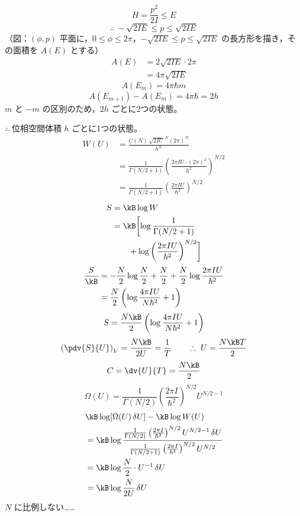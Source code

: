 \[ H=\frac{p^{2}}{2I}\le E \]
\[ \therefore\ -\sqrt{2IE}\le p\le\sqrt{2IE} \]
（図：$(\phi,p)$ 平面に，$0\le\phi\le2\pi$，$-\sqrt{2IE}\le p\le\sqrt{2IE}$ の長方形を描き，その面積を $A(E)$ とする）
\begin{align*}
A(E)&=2\sqrt{2IE}\cdot2\pi\\
&=4\pi\sqrt{2IE}
\end{align*}
\[ A(E_{m})=4\pi\hbar m \]
\[ A(E_{m+1})-A(E_{m})=4\pi\hbar=2h \]
$m$ と $-m$ の区別のため，$2h$ ごとに2つの状態。

$\therefore$ 位相空間体積 $h$ ごとに1つの状態。
\begin{align*}
W(U)&=\frac{C(N)\,\sqrt{2IU}^{\,N}(2\pi)^{N}}{h^{N}}\\
&=\frac{1}{\Gamma(N/2+1)}\left(\frac{2\pi IU\cdot(2\pi)^{2}}{h^{2}}\right)^{N/2}\\
&=\frac{1}{\Gamma(N/2+1)}\left(\frac{2\pi IU}{\hbar^{2}}\right)^{N/2}
\end{align*}
\begin{align*}
S&=\kB\log W\\
&=\kB\biggl[\log\frac{1}{\Gamma(N/2+1)}\\
&\qquad+\log\left(\frac{2\pi IU}{\hbar^{2}}\right)^{N/2}\biggr]
\end{align*}
\begin{align*}
\frac{S}{\kB}&=-\frac{N}{2}\log\frac{N}{2}+\frac{N}{2}+\frac{N}{2}\log\frac{2\pi IU}{\hbar^{2}}\\
&=\frac{N}{2}\left(\log\frac{4\pi IU}{N\hbar^{2}}+1\right)
\end{align*}
\[ S=\frac{N\kB}{2}\left(\log\frac{4\pi IU}{N\hbar^{2}}+1\right) \]
\[ \left(\pdv{S}{U}\right)_{V}=\frac{N\kB}{2U}=\frac{1}{T}\qquad\therefore\ U=\frac{N\kB T}{2} \]
\[ C=\dv{U}{T}=\frac{N\kB}{2} \]
\[ \Omega(U)=\frac{1}{\Gamma(N/2)}\left(\frac{2\pi I}{\hbar^{2}}\right)^{N/2}U^{N/2-1} \]
\begin{align*}
&\kB\log[\Omega(U)\,\delta U]-\kB\log W(U)\\
&=\kB\log\frac{\frac{1}{\Gamma(N/2)}\left(\frac{2\pi I}{\hbar^{2}}\right)^{N/2}U^{N/2-1}\,\delta U}{\frac{1}{\Gamma(N/2+1)}\left(\frac{2\pi I}{\hbar^{2}}\right)^{N/2}U^{N/2}}\\
&=\kB\log\frac{N}{2}\cdot U^{-1}\,\delta U\\
&=\kB\log\frac{N}{2U}\,\delta U
\end{align*}
$N$ に比例しない……
\mikai
{}
